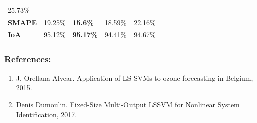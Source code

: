 \documentclass[11pt]{article}
\providecommand{\tightlist}{%
      \setlength{\itemsep}{0pt}\setlength{\parskip}{0pt}}
\begin{document}
\begin{longtable}[]{@{}lllll@{}}
\begin{minipage}[t]{0.17\columnwidth}
25.73\%\strut
\end{minipage}\tabularnewline
\begin{minipage}[t]{0.17\columnwidth}\raggedright
\textbf{SMAPE}\strut
\end{minipage} & \begin{minipage}[t]{0.17\columnwidth}\raggedright
19.25\%\strut
\end{minipage} & \begin{minipage}[t]{0.17\columnwidth}\raggedright
\textbf{15.6\%}\strut
\end{minipage} & \begin{minipage}[t]{0.17\columnwidth}\raggedright
18.59\%\strut
\end{minipage} & \begin{minipage}[t]{0.17\columnwidth}\raggedright
22.16\%\strut
\end{minipage}\tabularnewline
\begin{minipage}[t]{0.17\columnwidth}\raggedright
\textbf{IoA}\strut
\end{minipage} & \begin{minipage}[t]{0.17\columnwidth}\raggedright
95.12\%\strut
\end{minipage} & \begin{minipage}[t]{0.17\columnwidth}\raggedright
\textbf{95.17\%}\strut
\end{minipage} & \begin{minipage}[t]{0.17\columnwidth}\raggedright
94.41\%\strut
\end{minipage} & \begin{minipage}[t]{0.17\columnwidth}\raggedright
94.67\%\strut
\end{minipage}\tabularnewline
\bottomrule
\end{longtable}

    \hypertarget{references}{%
\subsubsection{References:}\label{references}}

\begin{enumerate}
\def\labelenumi{\arabic{enumi}.}
\tightlist
\item
  J. Orellana Alvear. Application of LS-SVMs to ozone forecasting in
  Belgium, 2015.
\item
  Denis Dumoulin. Fixed-Size Multi-Output LSSVM for Nonlinear System
  Identification, 2017.
\end{enumerate}


    
    
    
    
\end{document}

